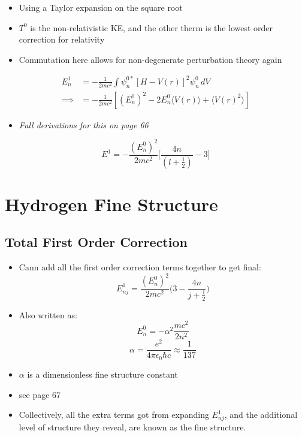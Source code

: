 \documentclass[a4paper,11pt,normalem]{article}
\begin{document}
\begin{itemize}
\item
  Using a Taylor expansion on the square root
\item
  \(T^0\) is the non-relativistic KE, and the other therm is the lowest
  order correction for relativity
\item
  Commutation here allows for non-degenerate perturbation theory again
\end{itemize}

\[
    \begin{aligned}
    E_n^1 &= -\frac{1}{2mc^2}\int \psi_n^{0*}[H - V(r)]^2 \psi_n^0\,dV \\
    \implies &= -\frac{1}{2mc^2}[(E_n^0)^2 - 2E_n^0 \langle V(r)\rangle + \langle V(r)^2\rangle]
    \end{aligned}
\]

\begin{itemize}
\item
  \emph{Full derivations for this on page 66}
\end{itemize}

\[
    E^1 = -\frac{(E_n^0)^2}{2mc^2}\Bigg[\frac{4n}{(l + \frac{1}{2})} - 3 \Bigg]
\]

\section{Hydrogen Fine Structure}\label{hydrogen-fine-structure}

\subsection{Total First Order Correction}\label{total-first-order-correction}

\begin{itemize}
\item
  Cann add all the first order correction terms together to get final:
\[
    E_{nj}^1 = \frac{(E_n^0)^2}{2mc^2}\Bigg(3 - \frac{4n}{j + \frac{1}{2}}\Bigg)
\]
\item Also written as:
\[
    E_n^0 = -\alpha^2\frac{mc^2}{2n^2} \] \[
    \alpha = \frac{e^2}{4\pi\epsilon_0 \hbar c} \approx \frac{1}{137}
\]
\item
  \(\alpha\) is a dimensionless fine structure constant
\item
  see page 67
\item
  Collectively, all the extra terms got from expanding \(E_{nj}^1\), and
  the additional level of structure they reveal, are known as the fine
  structure.
\end{itemize}
\end{document}
